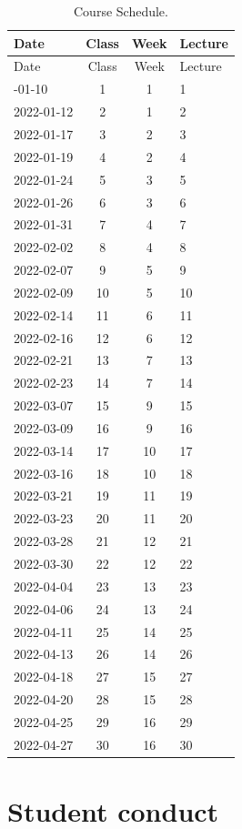\documentclass[11pt,]{article}
\begin{document}
\begin{longtable}[]{@{}lccl@{}}
\caption{Course Schedule.}\tabularnewline
\toprule\noalign{}
Date & Class & Week & Lecture \\
\midrule\noalign{}
\endfirsthead
\toprule\noalign{}
Date & Class & Week & Lecture \\
\midrule\noalign{}
\endhead
\bottomrule\noalign{}
\endlastfoot
2022-01-10 & 1 & 1 & 1 \\
2022-01-12 & 2 & 1 & 2 \\
2022-01-17 & 3 & 2 & 3 \\
2022-01-19 & 4 & 2 & 4 \\
2022-01-24 & 5 & 3 & 5 \\
2022-01-26 & 6 & 3 & 6 \\
2022-01-31 & 7 & 4 & 7 \\
2022-02-02 & 8 & 4 & 8 \\
2022-02-07 & 9 & 5 & 9 \\
2022-02-09 & 10 & 5 & 10 \\
2022-02-14 & 11 & 6 & 11 \\
2022-02-16 & 12 & 6 & 12 \\
2022-02-21 & 13 & 7 & 13 \\
2022-02-23 & 14 & 7 & 14 \\
2022-03-07 & 15 & 9 & 15 \\
2022-03-09 & 16 & 9 & 16 \\
2022-03-14 & 17 & 10 & 17 \\
2022-03-16 & 18 & 10 & 18 \\
2022-03-21 & 19 & 11 & 19 \\
2022-03-23 & 20 & 11 & 20 \\
2022-03-28 & 21 & 12 & 21 \\
2022-03-30 & 22 & 12 & 22 \\
2022-04-04 & 23 & 13 & 23 \\
2022-04-06 & 24 & 13 & 24 \\
2022-04-11 & 25 & 14 & 25 \\
2022-04-13 & 26 & 14 & 26 \\
2022-04-18 & 27 & 15 & 27 \\
2022-04-20 & 28 & 15 & 28 \\
2022-04-25 & 29 & 16 & 29 \\
2022-04-27 & 30 & 16 & 30 \\
\end{longtable}

\newpage

\hypertarget{student-conduct}{%
\section{Student conduct}\label{student-conduct}}
\end{document}
